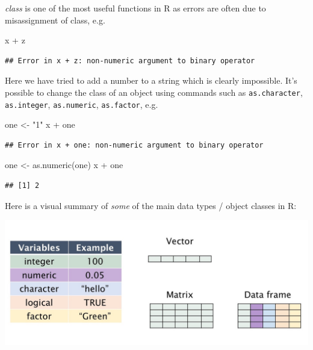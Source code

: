 \documentclass[]{article}
\newenvironment{Shaded}{\begin{snugshade}}{\end{snugshade}}
\newcommand{\FunctionTok}[1]{\textcolor[rgb]{0.00,0.00,0.00}{#1}}
\newcommand{\NormalTok}[1]{#1}
\newcommand{\OtherTok}[1]{\textcolor[rgb]{0.56,0.35,0.01}{#1}}
\newcommand{\SpecialCharTok}[1]{\textcolor[rgb]{0.00,0.00,0.00}{#1}}
\newcommand{\StringTok}[1]{\textcolor[rgb]{0.31,0.60,0.02}{#1}}
\begin{document}
\emph{class} is one of the most useful functions in R as errors are
often due to misassignment of class, e.g.

\begin{Shaded}
\begin{Highlighting}[]
\NormalTok{x }\SpecialCharTok{+}\NormalTok{ z}
\end{Highlighting}
\end{Shaded}

\begin{verbatim}
## Error in x + z: non-numeric argument to binary operator
\end{verbatim}

Here we have tried to add a number to a string which is clearly
impossible. It's possible to change the class of an object using
commands such as \texttt{as.character}, \texttt{as.integer},
\texttt{as.numeric}, \texttt{as.factor}, e.g.

\begin{Shaded}
\begin{Highlighting}[]
\NormalTok{one }\OtherTok{\textless{}{-}} \StringTok{"1"}
\NormalTok{x }\SpecialCharTok{+}\NormalTok{ one}
\end{Highlighting}
\end{Shaded}

\begin{verbatim}
## Error in x + one: non-numeric argument to binary operator
\end{verbatim}

\begin{Shaded}
\begin{Highlighting}[]
\NormalTok{one }\OtherTok{\textless{}{-}} \FunctionTok{as.numeric}\NormalTok{(one)}
\NormalTok{x }\SpecialCharTok{+}\NormalTok{ one }
\end{Highlighting}
\end{Shaded}

\begin{verbatim}
## [1] 2
\end{verbatim}

Here is a visual summary of \emph{some} of the main data types / object
classes in R:

\includegraphics{data_types.jpeg}
\end{document}

